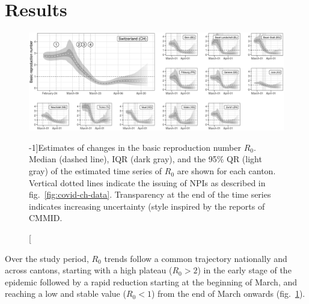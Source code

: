 \section{Results}
\begin{figure}\centering
  \includegraphics[width=\textwidth]{fig_covid-switzerland-npi/FIGURE_2.png}
  \caption[Estimates of changes in the basic reproduction number $R_0$][-1\baselineskip]{Estimates of changes in the basic reproduction number $R_0$. Median (dashed line), IQR (dark gray), and the 95\% QR (light gray) of the estimated time series of $R_0$ are shown for each canton. Vertical dotted lines indicate the issuing of NPIs as described in fig.~\ref{fig:covid-ch-data}. Transparency at the end of the time series indicates increasing uncertainty (style inspired by the reports of CMMID.}
  \label{fig:covid-ch-r0}
\end{figure}
Over the study period, $R_0$ trends follow a common trajectory nationally and across cantons, starting with a high plateau ($R_0 >2$) in the early stage of the epidemic followed by a rapid reduction starting at the beginning of March, and reaching a low and stable value ($R_0 <1$) from the end of March onwards (fig.~\ref{fig:covid-ch-r0}). 

